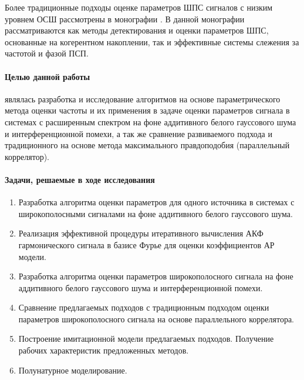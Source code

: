 Более традиционные подходы оценке параметров ШПС сигналов с низким уровнем ОСШ рассмотрены в монографии \cite{ziedan-book}.
В данной монографии рассматриваются как методы детектирования и оценки параметров ШПС, основанные на когерентном накоплении, так и эффективные
системы слежения за частотой и фазой ПСП.

\paragraph{Целью данной работы} являлась разработка и исследование алгоритмов на основе параметрического метода оценки частоты 
и их применения в задаче оценки параметров сигнала в системах с расширенным спектром на фоне аддитивного белого гауссового шума и интерференционной помехи,
а так же сравнение развиваемого подхода и традиционного на основе метода максимального правдоподобия (параллельный коррелятор).

\paragraph{Задачи, решаемые в ходе исследования}
\begin{enumerate}
	\item {Разработка алгоритма оценки параметров для одного источника в системах с широкополосными сигналами на фоне аддитивного
		белого гауссового шума.}
	\item {Реализация эффективной процедуры итеративного вычисления АКФ гармонического сигнала в базисе Фурье для оценки коэффициентов АР модели.}
	\item {Разработка алгоритма оценки параметров широкополосного сигнала на фоне аддитивного белого гауссового шума и
		интерференционной помехи.}
	\item {Сравнение предлагаемых подходов с традиционным подходом оценки параметров широкополосного сигнала на основе параллельного коррелятора.}
	\item {Построение имитационной модели предлагаемых подходов. Получение рабочих характеристик предложенных методов.}
	\item {Полунатурное моделирование.}
\end{enumerate}

